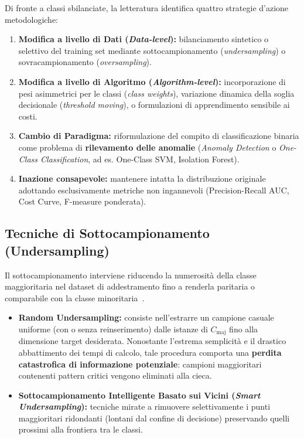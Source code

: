 Di fronte a classi sbilanciate, la letteratura identifica quattro strategie d'azione metodologiche:
\begin{enumerate}
    \item \textbf{Modifica a livello di Dati (\textit{Data-level}):} bilanciamento sintetico o selettivo del training set mediante sottocampionamento (\textit{undersampling}) o sovracampionamento (\textit{oversampling}).
    \item \textbf{Modifica a livello di Algoritmo (\textit{Algorithm-level}):} incorporazione di pesi asimmetrici per le classi (\textit{class weights}), variazione dinamica della soglia decisionale (\textit{threshold moving}), o formulazioni di apprendimento sensibile ai costi.
    \item \textbf{Cambio di Paradigma:} riformulazione del compito di classificazione binaria come problema di \textbf{rilevamento delle anomalie} (\textit{Anomaly Detection} o \textit{One-Class Classification}, ad es. One-Class SVM, Isolation Forest).
    \item \textbf{Inazione consapevole:} mantenere intatta la distribuzione originale adottando esclusivamente metriche non ingannevoli (Precision-Recall AUC, Cost Curve, F-measure ponderata).
\end{enumerate}

\FloatBarrier
\subsection{Tecniche di Sottocampionamento (Undersampling)}
\label{subsec:dm-undersampling}

Il sottocampionamento interviene riducendo la numerosità della classe maggioritaria nel dataset di addestramento fino a renderla paritaria o comparabile con la classe minoritaria~\cite{mannocci2026imbalanced}.

\begin{itemize}
    \item \textbf{Random Undersampling:} consiste nell'estrarre un campione casuale uniforme (con o senza reinserimento) dalle istanze di $C_{\text{maj}}$ fino alla dimensione target desiderata.
    Nonostante l'estrema semplicità e il drastico abbattimento dei tempi di calcolo, tale procedura comporta una \textbf{perdita catastrofica di informazione potenziale}: campioni maggioritari contenenti pattern critici vengono eliminati alla cieca.
    \item \textbf{Sottocampionamento Intelligente Basato sui Vicini (\textit{Smart Undersampling}):} tecniche mirate a rimuovere selettivamente i punti maggioritari ridondanti (lontani dal confine di decisione) preservando quelli prossimi alla frontiera tra le classi.
\end{itemize}

